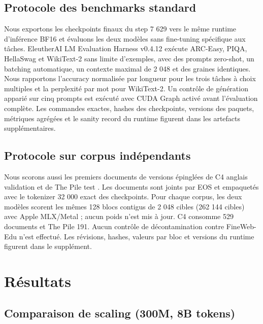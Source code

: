 \documentclass[10pt]{article}
\theoremstyle{definition}
\theoremstyle{remark}
\begin{document}
\subsection{Protocole des benchmarks standard}
\label{sec:benchmark_protocol}

Nous exportons les checkpoints finaux du step 7 629 vers le m\^{e}me runtime d'inf\'{e}rence BF16 et \'{e}valuons les deux mod\`{e}les sans fine-tuning sp\'{e}cifique aux t\^{a}ches. EleutherAI LM Evaluation Harness v0.4.12 ex\'{e}cute ARC-Easy, PIQA, HellaSwag et WikiText-2 sans limite d'exemples, avec des prompts zero-shot, un batching automatique, un contexte maximal de 2 048 et des graines identiques. Nous rapportons l'accuracy normalis\'{e}e par longueur pour les trois t\^{a}ches \`{a} choix multiples et la perplexit\'{e} par mot pour WikiText-2. Un contr\^{o}le de g\'{e}n\'{e}ration appari\'{e} sur cinq prompts est ex\'{e}cut\'{e} avec CUDA Graph activ\'{e} avant l'\'{e}valuation compl\`{e}te. Les commandes exactes, hashes des checkpoints, versions des paquets, m\'{e}triques agr\'{e}g\'{e}es et le sanity record du runtime figurent dans les artefacts suppl\'{e}mentaires.

\subsection{Protocole sur corpus ind\'{e}pendants}
\label{sec:heldout_protocol}

Nous scorons aussi les premiers documents de versions \'{e}pingl\'{e}es de C4 anglais validation et de The Pile test \citep{raffel2020exploring,gao2020pile}. Les documents sont joints par EOS et empaquet\'{e}s avec le tokenizer 32 000 exact des checkpoints. Pour chaque corpus, les deux mod\`{e}les scorent les m\^{e}mes 128 blocs contigus de 2 048 cibles (262 144 cibles) avec Apple MLX/Metal ; aucun poids n'est mis \`{a} jour. C4 consomme 529 documents et The Pile 191. Aucun contr\^{o}le de d\'{e}contamination contre FineWeb-Edu n'est effectu\'{e}. Les r\'{e}visions, hashes, valeurs par bloc et versions du runtime figurent dans le suppl\'{e}ment.

\section{R\'{e}sultats}
\label{sec:results}

\subsection{Comparaison de scaling (300M, 8B tokens)}
\label{sec:scaling_300m}
\end{document}
